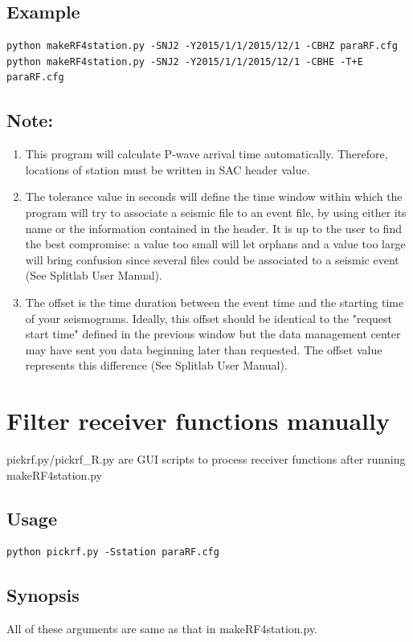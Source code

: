 \documentclass[12pt, a4paper]{report}
\begin{document}
\subsection{Example}
\begin{lstlisting}
python makeRF4station.py -SNJ2 -Y2015/1/1/2015/12/1 -CBHZ paraRF.cfg
python makeRF4station.py -SNJ2 -Y2015/1/1/2015/12/1 -CBHE -T+E paraRF.cfg
\end{lstlisting}
\subsection*{Note:}
\begin{enumerate}
\item This program will calculate P-wave arrival time automatically. Therefore, locations of station must be written in SAC header value.
\item The {\C tolerance} value in seconds will define the time window within which the program will try to associate a seismic file to an event file, by using either its name or the information contained in the header. It is up to the user to find the best compromise: a value too small will let orphans and a value too large will bring confusion since several files could be associated to a seismic event ({\ti See Splitlab User Manual}).
\item The {\C offset} is the time duration between the event time and the starting time of your seismograms. Ideally, this offset should be identical to the "request start time" defined in the previous window but the data management center may have sent you data beginning later than requested. The offset value represents this difference ({\ti See Splitlab User Manual}).
\end{enumerate}
\section{Filter receiver functions manually}
{\C pickrf.py/pickrf\_R.py} are GUI scripts to process receiver functions after running {\C makeRF4station.py}
\subsection{Usage}
\begin{lstlisting}
python pickrf.py -Sstation paraRF.cfg
\end{lstlisting}
\subsection{Synopsis}
All of these arguments are same as that in {\C makeRF4station.py}.
\end{document}
